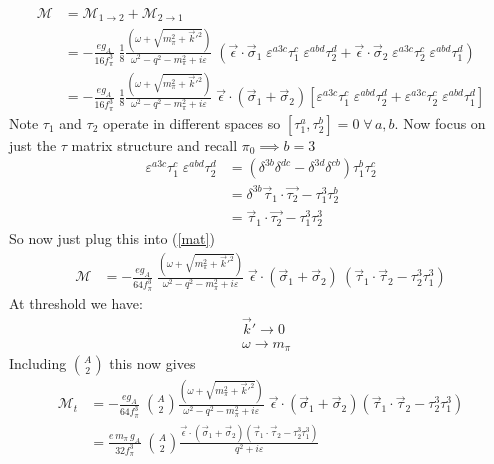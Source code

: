 \documentclass[11pt]{article}
\newcommand{\eps}{\epsilon}
\newcommand\ddfrac[2]{\frac{\displaystyle #1}{\displaystyle #2}}
\begin{document}
\begin{align}
    \mathcal{M} &= \mathcal{M}_{1\to2} + \mathcal{M}_{2\to1}\\
    &= -\frac{e g_A}{16 f_\pi^3}\;\frac{1}{8}  \ddfrac{ \left( \omega+\sqrt{m^2_{\pi} + \vec{k}'^2} \right) }{\omega^2 -q^2 - m_\pi^2 + i \varepsilon}\;\left( \vec{\eps}\cdot\vec{\sigma}_1 \; \varepsilon^{a3c} \tau_1^c\;\varepsilon^{abd} \tau_2^d + \vec{\eps}\cdot\vec{\sigma}_2 \; \varepsilon^{a3c} \tau_2^c\;\varepsilon^{abd} \tau_1^d \right)\\
               &= -\frac{e g_A}{16 f_\pi^3}\; \frac{1}{8}  \ddfrac{ \left( \omega+\sqrt{m^2_{\pi} + \vec{k}'^2} \right) }{\omega^2 -q^2 - m_\pi^2 + i \varepsilon}\;\vec{\eps}\cdot(\vec{\sigma}_1 + \vec{\sigma}_2)\left[ \varepsilon^{a3c}\tau_1^c\;\varepsilon^{abd} \tau_2^d + \varepsilon^{a3c}\tau_2^c\;\varepsilon^{abd} \tau_1^d \right]\label{mat}
\end{align}
Note $\tau_1$ and $\tau_2$ operate in different spaces so $ \left[ \tau_1^a, \tau_2^b \right]=0\; \forall\, a,b$. Now focus on just the $\tau$ matrix structure and recall $\pi_0 \implies b=3$
\begin{align}
    \varepsilon^{a3c} \tau_1^c\;\varepsilon^{abd} \tau_2^d &=(\delta^{3b} \delta^{dc} - \delta^{3d} \delta^{cb}) \tau_1^b \tau_2^c\\
                                                           &= \delta^{3b} \vec{\tau}_1 \cdot \vec{\tau_2} - \tau_1^3 \tau_2^b\\
                                                           &= \vec{\tau}_1 \cdot \vec{\tau_2} - \tau_1^3 \tau_2^3
\end{align}
So now just plug this into (\ref{mat}) 
\begin{align}
    \mathcal{M}&= -\frac{e g_A}{64 f_\pi^3}\; \ddfrac{ \left( \omega+\sqrt{m^2_{\pi} + \vec{k}'^2} \right) }{\omega^2 -q^2 - m_\pi^2 + i \varepsilon}\;\vec{\eps}\cdot(\vec{\sigma}_1 + \vec{\sigma}_2)\
    \left(\vec{\tau}_1 \cdot \vec{\tau}_2 - \tau_2^3 \tau_1^3\right) 
\end{align}
At threshold we have:
\begin{align}
    &\vec{k}'\to 0\\
    &\omega \to m_\pi
\end{align}
Including $\binom{A}{2}$ this now gives 
\begin{align}
    \mathcal{M}_t&= -\frac{e g_A}{64 f_\pi^3}\;\binom{A}{2} \ddfrac{ \left( \omega+\sqrt{m^2_{\pi} + \vec{k}'^2} \right) }{\omega^2 -q^2 - m_\pi^2 + i \varepsilon}\;\vec{\eps}\cdot(\vec{\sigma}_1 + \vec{\sigma}_2) \left(\vec{\tau}_1 \cdot \vec{\tau}_2 - \tau_2^3 \tau_1^3\right) \\
               &= \frac{e\, m_\pi\, g_A}{32 f_\pi^3}\;\binom{A}{2}
               \ddfrac{
                \vec{\eps}\cdot(\vec{\sigma}_1 + \vec{\sigma}_2)
               \left(\vec{\tau}_1 \cdot \vec{\tau}_2 - \tau_2^3 \tau_1^3\right)
           }{
           q^2 +i \varepsilon
           } 
\end{align}
\end{document}
